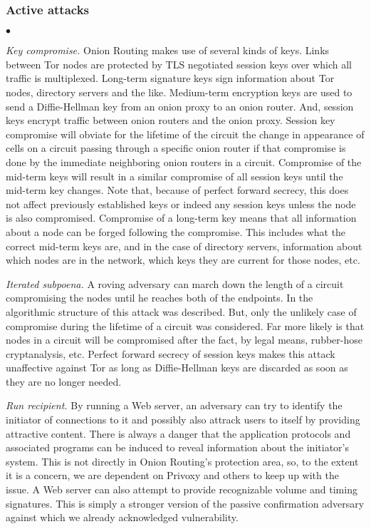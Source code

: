 \documentclass[times,10pt,twocolumn]{article}
\newenvironment{tightlist}{\begin{list}{$\bullet$}{
  \setlength{\itemsep}{0mm}
    \setlength{\parsep}{0mm}
    }}{\end{list}}
\begin{document}
\subsubsection*{Active attacks}
\begin{tightlist}
\item \emph{Key compromise.} Onion Routing makes use of several kinds
  of keys.  Links between Tor nodes are protected by TLS negotiated
  session keys over which all traffic is multiplexed.  Long-term
  signature keys sign information about Tor nodes, directory servers
  and the like. Medium-term encryption keys are used to send a
  Diffie-Hellman key from an onion proxy to an onion router. And,
  session keys encrypt traffic between onion routers and the onion
  proxy. Session key compromise will obviate for the lifetime of the
  circuit the change in appearance of cells on a circuit passing
  through a specific onion router if that compromise is done by the
  immediate neighboring onion routers in a circuit. Compromise of the
  mid-term keys will result in a similar compromise of all session
  keys until the mid-term key changes. Note that, because of perfect
  forward secrecy, this does not affect previously established keys or
  indeed any session keys unless the node is also compromised.
  Compromise of a long-term key means that all information about a
  node can be forged following the compromise. This includes what the
  correct mid-term keys are, and in the case of directory servers,
  information about which nodes are in the network, which keys they
  are current for those nodes, etc.

  
\item \emph{Iterated subpoena.} A roving adversary can march down the
  length of a circuit compromising the nodes until he reaches both of
  the endpoints.  In \cite{or-pet00} the algorithmic structure of this
  attack was described. But, only the unlikely case of compromise
  during the lifetime of a circuit was considered. Far more likely is
  that nodes in a circuit will be compromised after the fact, by legal
  means, rubber-hose cryptanalysis, etc. Perfect forward secrecy of
  session keys makes this attack unaffective against Tor as long as
  Diffie-Hellman keys are discarded as soon as they are no longer
  needed.
  
\item \emph{Run recipient.} By running a Web server, an adversary can
  try to identify the initiator of connections to it and possibly also
  attrack users to itself by providing attractive content. There is
  always a danger that the application protocols and associated
  programs can be induced to reveal information about the initiator's
  system. This is not directly in Onion Routing's protection area, so,
  to the extent it is a concern, we are dependent on Privoxy and
  others to keep up with the issue. A Web server can also attempt to
  provide recognizable volume and timing signatures. This is simply a
  stronger version of the passive confirmation adversary against which
  we already acknowledged vulnerability.
  

\end{tightlist}
\end{document}
